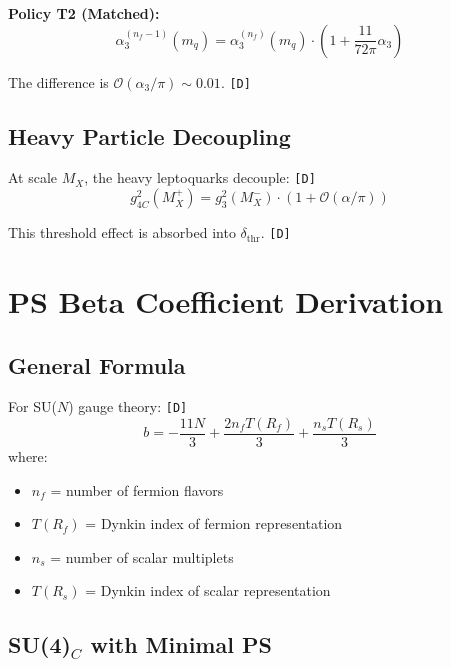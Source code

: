 \documentclass[11pt,a4paper]{article}
\newcommand{\tagD}{\textcolor{green!50!black}{\texttt{[D]}}}
\theoremstyle{definition}
\begin{document}
\textbf{Policy T2 (Matched):}
\begin{equation}
\label{eq:app-t2-matched}
\alpha_3^{(n_f-1)}(m_q) = \alpha_3^{(n_f)}(m_q) \cdot \left(1 + \frac{11}{72\pi}\alpha_3\right)
\end{equation}

The difference is $\mathcal{O}(\alpha_3/\pi) \sim 0.01$. \tagD{}

\subsection{Heavy Particle Decoupling}
\label{app:decoupling}

At scale $M_X$, the heavy leptoquarks decouple: \tagD{}
\begin{equation}
\label{eq:app-decoupling}
g_{4C}^2(M_X^+) = g_3^2(M_X^-) \cdot \left(1 + \mathcal{O}(\alpha/\pi)\right)
\end{equation}

This threshold effect is absorbed into $\delta_{\text{thr}}$. \tagD{}

\section{PS Beta Coefficient Derivation}
\label{app:ps-beta}

\subsection{General Formula}
\label{app:general-beta}

For SU($N$) gauge theory: \tagD{}
\begin{equation}
\label{eq:app-beta-general}
b = -\frac{11N}{3} + \frac{2n_f T(R_f)}{3} + \frac{n_s T(R_s)}{3}
\end{equation}
where:
\begin{itemize}
  \item $n_f$ = number of fermion flavors
  \item $T(R_f)$ = Dynkin index of fermion representation
  \item $n_s$ = number of scalar multiplets
  \item $T(R_s)$ = Dynkin index of scalar representation
\end{itemize}

\subsection{SU(4)$_C$ with Minimal PS}
\label{app:su4-minimal}
\end{document}
